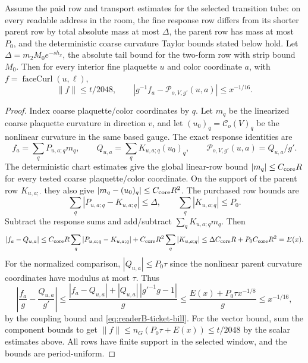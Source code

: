 \begin{lemma}
\label{lem:readerB-pointing}
Assume the paid row and transport estimates for the selected transition
tube: on every readable address in the room, the fine response row differs
from its shorter parent row by total absolute mass at most $\Delta$, the
parent row has mass at most $P_0$, and the deterministic coarse curvature
Taylor bounds stated below hold. Let
$\Delta=m_2 M_0 e^{-s h_x}$, the absolute tail bound for the
two-form row with strip bound $M_0$. Then for every interior fine
plaquette $u$ and color coordinate $a$, with
$f=\operatorname{faceCurl}(u,\ell)$,
\begin{equation}\label{eq:readerB-pointing-conclusion}
 \|f\|\leq t/2048,\qquad
 \left|g^{-1}f_a-\mathcal P_{o,V,g'}(u,a)\right|
      \leq x^{-1/16}.
\end{equation}
\end{lemma}
\begin{proof}
Index coarse plaquette/color coordinates by $q$. Let $m_q$ be the
linearized coarse plaquette curvature in direction $v$, and let
$(u_0)_q=\mathcal C_o(V)_q$ be the nonlinear curvature in the same based
gauge. The exact response identities are
\[
 f_a=\sum_q P_{u,a;q}m_q,
 \qquad Q_{u,a}=\sum_qK_{u,a;q}(u_0)_q,
 \qquad \mathcal P_{o,V,g'}(u,a)=Q_{u,a}/g'.
\]
The deterministic chart estimates give the global linear-row bound
$|m_q|\leq C_{\rm core}R$ for every tested coarse plaquette/color
coordinate. On the support of the parent row $K_{u,a;\cdot}$ they also give
$|m_q-(u_0)_q|\leq C_{\rm core}R^2$.
The purchased row bounds are
\[
 \sum_q|P_{u,a;q}-K_{u,a;q}|\leq\Delta,
 \qquad \sum_q|K_{u,a;q}|\leq P_0.
\]
Subtract the response sums and add/subtract $\sum_qK_{u,a;q}m_q$. Then
\[
 |f_a-Q_{u,a}|
 \leq C_{\rm core}R\sum_q|P_{u,a;q}-K_{u,a;q}|
       +C_{\rm core}R^2\sum_q|K_{u,a;q}|
 \leq \Delta C_{\rm core}R+P_0C_{\rm core}R^2
 =E(x).
\]
For the normalized comparison, $|Q_{u,a}|\leq P_0\tau$ since the
nonlinear parent curvature coordinates have modulus at most $\tau$. Thus
\[
 \left|\frac{f_a}{g}-\frac{Q_{u,a}}{g'}\right|
 \leq\frac{|f_a-Q_{u,a}|+|Q_{u,a}|\,|g'^{-1}g-1|}{g}
 \leq\frac{E(x)+P_0\tau x^{-1/8}}g
 \leq x^{-1/16},
\]
by the coupling bound and \eqref{eq:readerB-ticket-bill}. For the vector
bound, sum the component bounds to get
$\|f\|\le n_G(P_0\tau+E(x))\le t/2048$ by the scalar estimates above.
All rows have
finite support in the selected window, and the bounds are period-uniform.
\end{proof}

